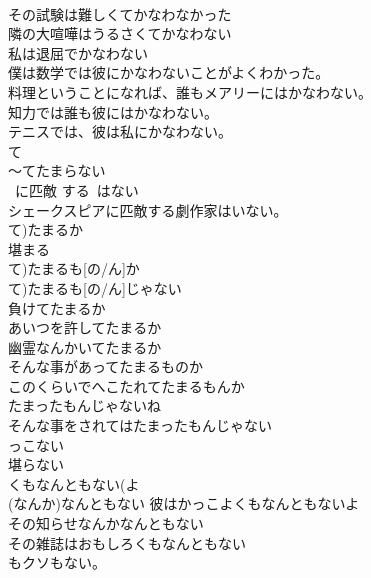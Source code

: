 \documentclass[8pt]{extreport}
\begin{document}
\begin{CJK}{UTF8}{min}
\\	その試験は難しくてかなわなかった 
\\	隣の大喧嘩はうるさくてかなわない 
\\	私は退屈でかなわない 
\\	僕は数学では彼にかなわないことがよくわかった。 
\\	料理ということになれば、誰もメアリーにはかなわない。 
\\	知力では誰も彼にはかなわない。 
\\	テニスでは、彼は私にかなわない。 
\\	て 
\\	～てたまらない 
\\	~に匹敵 する~はない 
\\	シェークスピアに匹敵する劇作家はいない。 
\\	て)たまるか 
\\	堪まる 
\\	て)たまるも[の/ん]か 
\\	て)たまるも[の/ん]じゃない	
\\	負けてたまるか 
\\	あいつを許してたまるか 
\\	幽霊なんかいてたまるか 
\\	そんな事があってたまるものか 
\\	このくらいでへこたれてたまるもんか 
\\	たまったもんじゃないね 
\\	そんな事をされてはたまったもんじゃない 
\\	っこない 
\\	堪らない 
\\	くもなんともない(よ 
\\	(なんか)なんともない		彼はかっこよくもなんともないよ 
\\	その知らせなんかなんともない 
\\	その雑誌はおもしろくもなんともない 
\\	[~く]もクソもない。	
\end{CJK}
\end{document}
